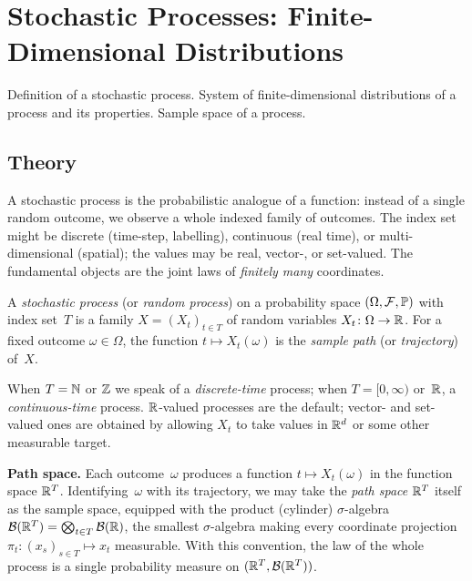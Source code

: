 
\section{Stochastic Processes: Finite-Dimensional Distributions}
\label{sec:1.2.07-stochastic-processes}

\begin{ticket}
Definition of a stochastic process. System of finite-dimensional distributions of a process and its properties. Sample space of a process.
\end{ticket}

\subsection*{Theory}

A stochastic process is the probabilistic analogue of a function:
instead of a single random outcome, we observe a whole indexed
family of outcomes. The index set might be discrete (time-step,
labelling), continuous (real time), or multi-dimensional
(spatial); the values may be real, vector-, or set-valued. The
fundamental objects are the joint laws of \emph{finitely many}
coordinates.

\begin{definition}
\label{def:stochastic-process}
A \emph{stochastic process} (or \emph{random process}) on a
probability space $(\Omega, \mathcal{F}, \mathbb{P})$ with index
set~$T$ is a family $X = (X_t)_{t \in T}$ of random variables
$X_t \colon \Omega \to \mathbb{R}$. For a fixed outcome
$\omega \in \Omega$, the function $t \mapsto X_t(\omega)$ is the
\emph{sample path} (or \emph{trajectory}) of~$X$.
\end{definition}

When $T = \mathbb{N}$ or $\mathbb{Z}$ we speak of a \emph{discrete-time} process;
when $T = [0, \infty)$ or~$\mathbb{R}$, a \emph{continuous-time} process.
$\mathbb{R}$-valued processes are the default; vector- and set-valued ones
are obtained by allowing $X_t$ to take values in $\mathbb{R}^d$ or some
other measurable target.

\medskip
\noindent\textbf{Path space.} Each outcome~$\omega$ produces a
function $t \mapsto X_t(\omega)$ in the function space $\mathbb{R}^T$.
Identifying~$\omega$ with its trajectory, we may take the
\emph{path space} $\mathbb{R}^T$ itself as the sample space, equipped with
the product (cylinder) $\sigma$-algebra
$\mathcal{B}(\mathbb{R}^T) = \bigotimes_{t \in T} \mathcal{B}(\mathbb{R})$, the
smallest $\sigma$-algebra making every coordinate projection
$\pi_t \colon (x_s)_{s \in T} \mapsto x_t$ measurable. With this
convention, the law of the whole process is a single probability
measure on $(\mathbb{R}^T, \mathcal{B}(\mathbb{R}^T))$.

